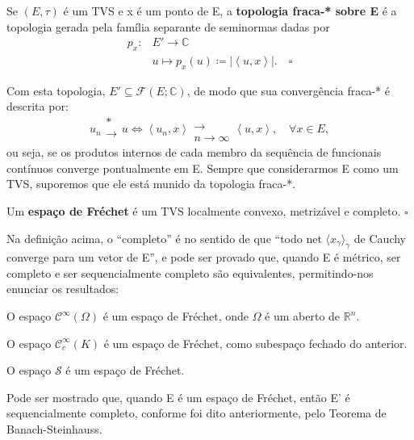 \documentclass[../distribution_theory_notes.tex]{subfiles}
\begin{document}
\begin{def*}
	Se \((E, \tau )\) é um TVS e x é um ponto de E, a \textbf{topologia fraca-* sobre E} é a topologia gerada pela família separante de seminormas dadas por
	\begin{align*}
		p_x: & E'\rightarrow \mathbb{C}                                     \\
		     & u\mapsto p_x(u)\coloneqq |\left< u, x \right>|.\quad \square
	\end{align*}
\end{def*}
Com esta topologia, \(E'\subseteq \mathcal{F}(E; \mathbb{C})\), de modo que sua convergência fraca-* é descrita por:
\[
	u_{n}\substack{*\\ \longrightarrow \\ }u \Longleftrightarrow  \left< u_{n}, x \right>\substack{ \\ \longrightarrow \\ n\to \infty}\left< u, x \right>,\quad \forall x\in E,
\]
ou seja, se os produtos internos de cada membro da sequência de funcionais contínuos converge pontualmente em E. Sempre que considerarmos E como um TVS, suporemos que ele está munido da topologia fraca-*.

\begin{def*}
	Um \textbf{espaço de Fréchet} é um TVS localmente convexo, metrizável e completo. \(\square\)
\end{def*}

Na definição acima, o ``completo'' é no sentido de que ``todo net \(\langle x_{\gamma } \rangle_{\gamma }\) de Cauchy converge para um vetor de E'', e pode ser provado que, quando E é métrico, ser completo e ser sequencialmente completo são equivalentes, permitindo-nos enunciar os resultados:

\begin{theorem*}
	O espaço \(\mathcal{C}^{\infty}(\Omega )\) é um espaço de Fréchet, onde \(\Omega \) é um aberto de \(\mathbb{R}^{n}\).
\end{theorem*}
\begin{crl*}
	O espaço \(\mathcal{C}_{c}^{\infty}(K )\) é um espaço de Fréchet, como subespaço fechado do anterior.
\end{crl*}
\begin{theorem*}
	O espaço \(\mathcal{S}\) é um espaço de Fréchet.
\end{theorem*}

\begin{tcolorbox}[
		skin=enhanced,
		title=Observação,
		fonttitle=\bfseries,
		colframe=black,
		colbacktitle=cyan!75!white,
		colback=cyan!15,
		colbacklower=black,
		coltitle=black,
		drop fuzzy shadow,
	]
	Pode ser mostrado que, quando E é um espaço de Fréchet, então E' é sequencialmente completo, conforme foi dito anteriormente, pelo Teorema de Banach-Steinhauss.
\end{tcolorbox}
\end{document}
